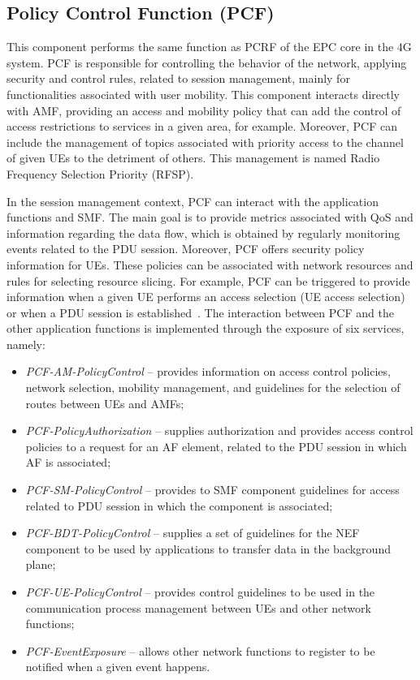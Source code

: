 \subsection*{Policy Control Function (PCF)}

This component performs the same function as PCRF of the EPC core in the 4G system. PCF is responsible for controlling the behavior of the network, applying security and control rules, related to session management, mainly for functionalities associated with user mobility. This component interacts directly with AMF, providing an access and mobility policy that can add the control of access restrictions to services in a given area, for example. Moreover, PCF can include the management of topics associated with priority access to the channel of given UEs to the detriment of others. This management is named Radio Frequency Selection Priority (RFSP).

In the session management context, PCF can interact with the application functions and SMF. The main goal is to provide metrics associated with QoS and information regarding the data flow, which is obtained by regularly monitoring events related to the PDU session. Moreover, PCF offers security policy information for UEs. These policies can be associated with network resources and rules for selecting resource slicing. For example, PCF can be triggered to provide information when a given UE performs an access selection (UE access selection) or when a PDU session is established~\cite{hedman20195g}. The interaction between PCF and the other application functions is implemented through the exposure of six services, namely:

\begin{itemize}
\item \textit{PCF-AM-PolicyControl} -- provides information on access control policies, network selection, mobility management, and guidelines for the selection of routes between UEs and AMFs;
\item \textit{PCF-PolicyAuthorization} -- supplies authorization and provides access control policies to a request for an AF element, related to the PDU session in which AF is associated;
\item \textit{PCF-SM-PolicyControl} -- provides to SMF component guidelines for access related to PDU session in which the component is associated;
\item \textit{PCF-BDT-PolicyControl} -- supplies a set of guidelines for the NEF component to be used by applications to transfer data in the background plane;
\item \textit{PCF-UE-PolicyControl} -- provides control guidelines to be used in the communication process management between UEs and other network functions;
\item \textit{PCF-EventExposure} -- allows other network functions to register to be notified when a given event happens.
\end{itemize}

